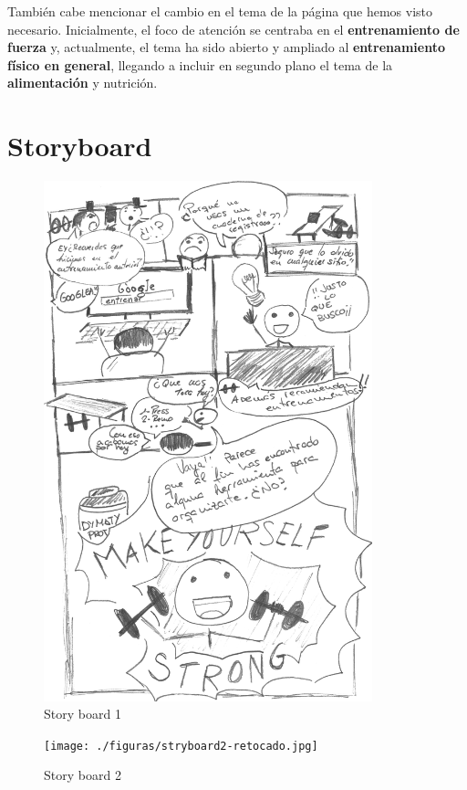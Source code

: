 \documentclass[a4paper]{article}
\begin{document}
También cabe mencionar el cambio en el tema de la página que hemos visto necesario. Inicialmente, el foco de atención se centraba en el \textbf{entrenamiento de fuerza} y, actualmente, el tema ha sido abierto y ampliado al \textbf{entrenamiento físico en general}, llegando a incluir en segundo plano el tema de la \textbf{alimentación} y nutrición.

\FloatBarrier
\section{Storyboard}

\begin{figure}[!h]
\centering
\includegraphics[width=0.85\textwidth]{./figuras/storyboard1-mas-negro.jpg}
\caption{Story board 1}
\end{figure}

\begin{figure}[!h]
\centering
\texttt{[image: ./figuras/stryboard2-retocado.jpg]}
\caption{Story board 2}
\end{figure}
\end{document}
